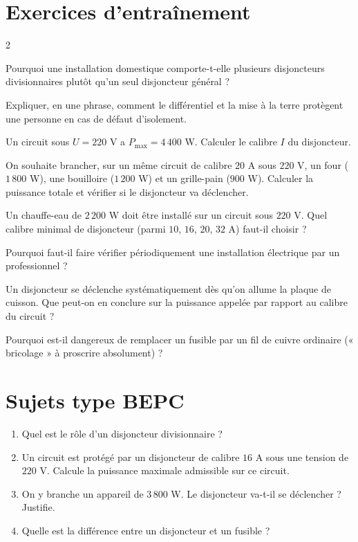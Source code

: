 \section{Exercices d'entraînement}
\begin{multicols}{2}

\exo{} Pourquoi une installation domestique comporte-t-elle plusieurs
disjoncteurs divisionnaires plutôt qu'un seul disjoncteur général ?

\exo{} Expliquer, en une phrase, comment le différentiel et la mise à la terre
protègent une personne en cas de défaut d'isolement.

\exo{} Un circuit sous $U=220$ V a $P_{\max}=4\,400$ W. Calculer le calibre $I$
du disjoncteur.

\exo{} On souhaite brancher, sur un même circuit de calibre $20$ A sous $220$ V,
un four ($1\,800$ W), une bouilloire ($1\,200$ W) et un grille-pain ($900$ W). Calculer la
puissance totale et vérifier si le disjoncteur va déclencher.

\exo{} Un chauffe-eau de $2\,200$ W doit être installé sur un circuit sous
$220$ V. Quel calibre minimal de disjoncteur (parmi $10$, $16$, $20$, $32$ A) faut-il
choisir ?

\exo{} Pourquoi faut-il faire vérifier périodiquement une installation
électrique par un professionnel ?

\exo{} Un disjoncteur se déclenche systématiquement dès qu'on allume la plaque de
cuisson. Que peut-on en conclure sur la puissance appelée par rapport au calibre du
circuit ?

\exo{} Pourquoi est-il dangereux de remplacer un fusible par un fil de cuivre
ordinaire (« bricolage » à proscrire absolument) ?

\end{multicols}

\section{Sujets type BEPC}

\begin{enumerate}[label=\arabic*)]
\item Quel est le rôle d'un disjoncteur divisionnaire ?
\item Un circuit est protégé par un disjoncteur de calibre $16$ A sous une tension de
$220$ V. Calcule la puissance maximale admissible sur ce circuit.
\item On y branche un appareil de $3\,800$ W. Le disjoncteur va-t-il se déclencher ?
Justifie.
\item Quelle est la différence entre un disjoncteur et un fusible ?
\end{enumerate}

